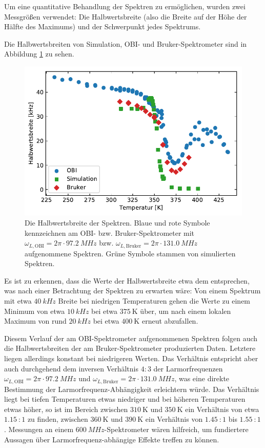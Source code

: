 Um eine quantitative Behandlung der Spektren zu ermöglichen, wurden zwei Messgrößen verwendet: Die Halbwertsbreite (also die Breite auf der Höhe der Hälfte des Maximums) und der Schwerpunkt jedes Spektrums. 

Die Halbwertsbreiten von Simulation, OBI- und Bruker-Spektrometer sind in Abbildung \ref{fig:res:spek_fwhm} zu sehen.
\begin{figure}
	\begin{center}
		\includegraphics[width=.9\textwidth]{graphics/plot/fwhm.pdf}
	\end{center}
	\caption{Die Halbwertsbreite der Spektren. Blaue und rote Symbole kennzeichnen am OBI- bzw. Bruker-Spektrometer mit $\omega_{L, \text{OBI}} = 2\pi \cdot \SI{97.2}{MHz}$ bzw. $\omega_{L, \text{Bruker}} = 2\pi \cdot \SI{131.0}{MHz}$ aufgenommene Spektren. Grüne Symbole stammen von simulierten Spektren.} \label{fig:res:spek_fwhm}
\end{figure}

Es ist zu erkennen, dass die Werte der Halbwertsbreite etwa dem entsprechen, was nach einer Betrachtung der Spektren zu erwarten wäre: Von einem Spektrum mit etwa $\SI{40}{kHz}$ Breite bei niedrigen Temperaturen gehen die Werte zu einem Minimum von etwa $\SI{10}{kHz}$ bei etwa $\SI{375}{\kelvin}$ über, um nach einem lokalen Maximum von rund $\SI{20}{kHz}$ bei etwa $\SI{400}{\kelvin}$ erneut abzufallen.

Diesem Verlauf der am OBI-Spektrometer aufgenommenen Spektren folgen auch die Halbwertsbreiten der am Bruker-Spektrometer produzierten Daten. Letztere liegen allerdings konstant bei niedrigeren Werten. Das Verhältnis entspricht aber auch durchgehend dem inversen Verhältnis $4:3$ der Larmorfrequenzen $\omega_{L, \text{OBI}} = 2\pi \cdot \SI{97.2}{MHz}$ und $\omega_{L, \text{Bruker}} = 2\pi \cdot \SI{131.0}{MHz}$, was eine direkte Bestimmung der Lar\-mor\-fre\-quenz-Ab\-häng\-ig\-keit erleichtern würde. Das Verhältnis liegt bei tiefen Temperaturen etwas niedriger und bei höheren Temperaturen etwas höher, so ist im Bereich zwischen $\SI{310}{\kelvin}$ und $\SI{350}{\kelvin}$ ein Verhältnis von etwa $\SI{1.15}{}:1$ zu finden, zwischen $\SI{360}{\kelvin}$ und $\SI{390}{\kelvin}$ ein Verhältnis von $\SI{1.45}{}:1$ bis $\SI{1.55}{}:1$. Messungen an einem $\SI{600}{MHz}$-Spektrometer wären hilfreich, um fundiertere Aussagen über Larmorfrequenz-abhängige Effekte treffen zu können.

